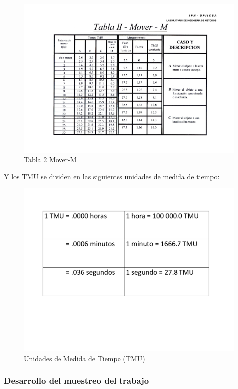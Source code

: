     \begin{figure}[H]
        \centering
        \includegraphics[scale=0.150]{21/img/tabla2MoverM.pdf}
        \caption{Tabla 2 Mover-M}
        \label{fig:tabla2MoverM}
    \end{figure}
    Y los TMU se dividen en las siguientes unidades de medida de tiempo: 
    \begin{figure}[H]
        \centering
        \includegraphics[scale=0.200]{21/img/unidadesMedidaTiempoTMU.pdf}
        \caption{Unidades de Medida de Tiempo (TMU)}
        \label{fig:unidadesMedidaTiempoTMU}
    \end{figure}
    
    
    
    \subsubsection{Desarrollo del muestreo del trabajo}
    
